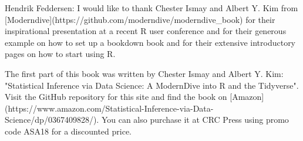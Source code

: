 \cleardoublepage\newpage
\thispagestyle{empty}

\begin{center}
Hendrik Feddersen: I would like to thank Chester Ismay and Albert Y. Kim from [Moderndive](https://github.com/moderndive/moderndive_book) for their inspirational presentation at a recent R user conference and for their generous example on how to set up a bookdown book and for their extensive introductory pages on how to start using R.

\vspace{0.3in}

The first part of this book was written by Chester Ismay and Albert Y. Kim: "Statistical Inference via Data Science: A ModernDive into R and the Tidyverse". Visit the GitHub repository for this site and find the book on [Amazon](https://www.amazon.com/Statistical-Inference-via-Data-Science/dp/0367409828/). You can also purchase it at CRC Press using promo code ASA18 for a discounted price.
\end{center}

\setlength{\abovedisplayskip}{-5pt}
\setlength{\abovedisplayshortskip}{-5pt}
